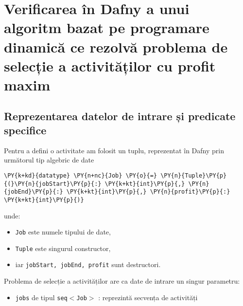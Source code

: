
\lstset{style=mystyle}
\chapter{Verificarea în Dafny a unui algoritm bazat pe programare dinamică ce rezolvă problema de selecție a activităților cu profit maxim}

\section{Reprezentarea datelor de intrare și predicate specifice }

Pentru a defini o activitate am folosit un tuplu, reprezentat în Dafny prin următorul tip algebric de date 
\begin{Verbatim}[commandchars=\\\{\}, fontsize=\footnotesize]
\PY{k+kd}{datatype} \PY{n+nc}{Job} \PY{o}{=} \PY{n}{Tuple}\PY{p}{(}\PY{n}{jobStart}\PY{p}{:} \PY{k+kt}{int}\PY{p}{,} \PY{n}{jobEnd}\PY{p}{:} \PY{k+kt}{int}\PY{p}{,} \PY{n}{profit}\PY{p}{:} \PY{k+kt}{int}\PY{p}{)}
\end{Verbatim}
unde:
\begin{itemize}
    \item \texttt{Job} este numele tipului de date, 
    \item \texttt{Tuple} este singurul constructor,
    \item iar \texttt{jobStart, jobEnd, profit} sunt destructori.
\end{itemize}

Problema de selecție a activităților are ca date de intrare un singur parametru:
\begin{itemize}
    \item \texttt{jobs} de tipul \texttt{seq$<$Job$>$} : reprezintă secvența de activități 
\end{itemize}

